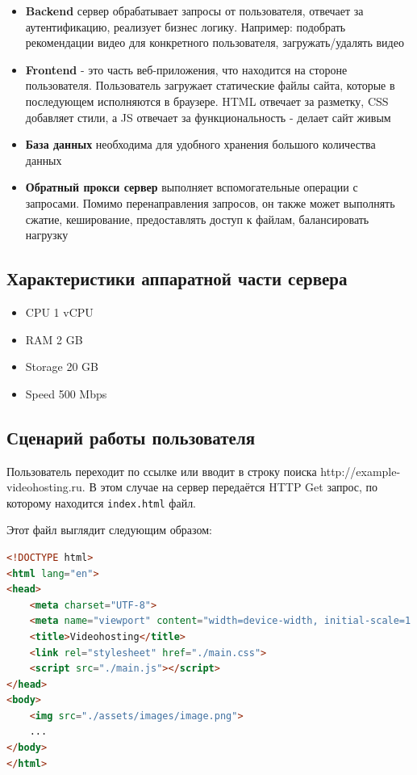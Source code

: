 \documentclass[12pt]{article}
\begin{document}
\begin{itemize}
    \item \textbf{Backend} сервер обрабатывает запросы от пользователя, отвечает за аутентификацию,
          реализует бизнес логику. Например: подобрать рекомендации видео для конкретного пользователя, загружать/удалять видео
    \item \textbf{Frontend} - это часть веб-приложения, что находится на стороне пользователя.
          Пользователь загружает статические файлы сайта, которые в последующем исполняются в браузере.
          HTML отвечает за разметку, CSS добавляет стили, а JS отвечает за функциональность - делает сайт живым
    \item \textbf{База данных} необходима для удобного хранения большого количества данных
    \item \textbf{Обратный прокси сервер} выполняет вспомогательные операции с запросами.
          Помимо перенаправления запросов, он также может выполнять сжатие, кеширование, предоставлять доступ к файлам,
          балансировать нагрузку
\end{itemize}

\subsection{Характеристики аппаратной части сервера}

\begin{itemize}
    \item CPU 1 vCPU
    \item RAM 2 GB
    \item Storage 20 GB
    \item Speed 500 Mbps
\end{itemize}

\subsection{Сценарий работы пользователя}

Пользователь переходит по ссылке или вводит в строку поиска http://example-videohosting.ru.
В этом случае на сервер передаётся HTTP Get запрос, по которому находится \verb|index.html| файл.

Этот файл выглядит следующим образом:

\begin{lstlisting}[language=HTML]
<!DOCTYPE html>
<html lang="en">
<head>
    <meta charset="UTF-8">
    <meta name="viewport" content="width=device-width, initial-scale=1.0">
    <title>Videohosting</title>
    <link rel="stylesheet" href="./main.css">
    <script src="./main.js"></script>
</head>
<body>
    <img src="./assets/images/image.png">
    ...
</body>
</html>
\end{lstlisting}
\end{document}
